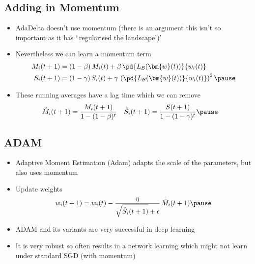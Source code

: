 
\begin{slide}
\section[-2]{Adding in Momentum}

\begin{PauseHighLight}
  \begin{itemize}
  \item AdaDelta doesn't use momentum (there is an argument this isn't
    so important as it has ``regularised the landscape')'\pause
  \item Nevertheless we can learn a momentum term
    {\small
    \begin{align*}
      M_i(t+1)
      &= (1-\beta)\,M_i(t) + \beta \,
        \pd{L_{\mathcal{B}}(\bm{w}(t))}{w_i(t)}
      \\
      S_i(t+1)
      &= (1-\gamma)\,S_i(t) + \gamma \,
        \left( \pd{L_{\mathcal{B}}(\bm{w}(t))}{w_i(t)} \right)^2\pause
    \end{align*}}
  \item These running averages have a lag time which we can remove
    \begin{align*}
      \hat{M}_i(t+1) &= \frac{M_i(t+1)}{1-(1-\beta)^t}
      &
        \hat{S}_i(t+1) &= \frac{S(t+1)}{1-(1-\gamma)^t}\pause
    \end{align*}
 \end{itemize}
\end{PauseHighLight}

\end{slide}


\begin{slide}
\section{ADAM}

\begin{PauseHighLight}
  \begin{itemize}
  \item Adaptive Moment Estimation (Adam) adapts the scale of the
    parameters, but also uses momentum\pause
  \item Update weights
    \begin{align*}
      w_i(t+1) = w_i(t) - \frac{\eta}{\sqrt{\hat{S}_i(t+1)} + \epsilon}\,
      \hat{M}_i(t+1)\pause
    \end{align*}
  \item ADAM and its variants are very successful in deep
    learning\pause
  \item It is very robust so often results in a network learning which
    might not learn under standard SGD (with momentum)\pause
  \end{itemize}
\end{PauseHighLight}

\end{slide}

